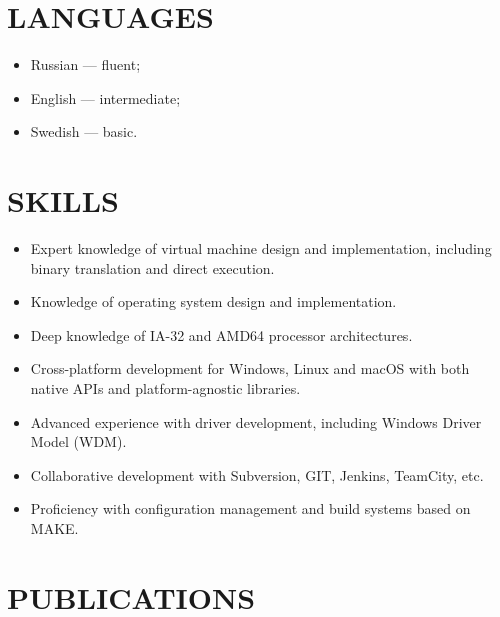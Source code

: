 ﻿\documentclass[12pt, a4paper, oneside]{article}
\begin{document}
\section*{LANGUAGES}

\begin{itemize}
\item Russian --- fluent;
\item English --- intermediate;
\item Swedish --- basic.
\end{itemize}

\section*{SKILLS}

\begin{itemize}
\item Expert knowledge of virtual machine design and implementation,
  including binary translation and direct execution.
\item Knowledge of operating system design and implementation.
\item Deep knowledge of IA-32 and AMD64 processor architectures.
\item Cross-platform development for Windows, Linux and macOS with both native
  APIs and platform-agnostic libraries.
\item Advanced experience with driver development, including Windows Driver
  Model (WDM).
\item Collaborative development with Subversion, GIT, Jenkins, TeamCity, etc.
\item Proficiency with configuration management and build systems based on MAKE.
\end{itemize}

\section*{PUBLICATIONS}
\end{document}
